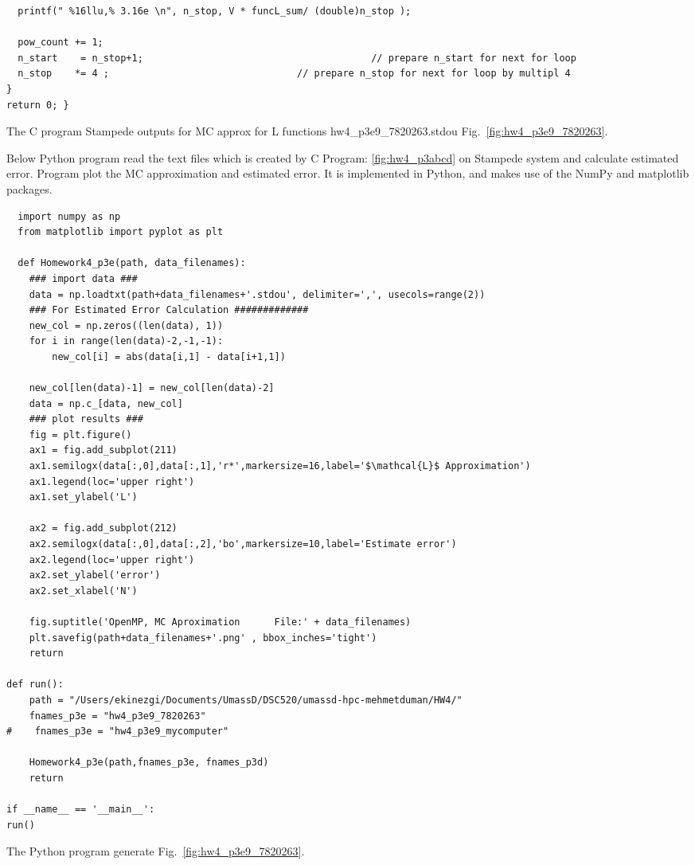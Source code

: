\documentclass{article}
\begin{document}
\begin{program}
\begin{verbatim}
  printf(" %16llu,% 3.16e \n", n_stop, V * funcL_sum/ (double)n_stop );

  pow_count += 1;
  n_start    = n_stop+1;                                        // prepare n_start for next for loop
  n_stop    *= 4 ;                                 // prepare n_stop for next for loop by multipl 4
}
return 0; }
	\end{verbatim}
	\caption{The C program Stampede outputs for MC approx for L functions hw4\_p3e9\_7820263.stdou Fig.\ \ref{fig:hw4_p3e9_7820263}.}
	\label{fig:hw4_p3e9}
 \end{program}																								 

\newpage


Below Python program read the text files which is created by C Program: \ref{fig:hw4_p3abcd} on Stampede system and calculate estimated error. Program  plot the MC approximation and estimated error. 
It is implemented in Python, and makes use of the NumPy and matplotlib packages.
\begin{program}
	\begin{verbatim}
  import numpy as np
  from matplotlib import pyplot as plt

  def Homework4_p3e(path, data_filenames):
    ### import data ###
    data = np.loadtxt(path+data_filenames+'.stdou', delimiter=',', usecols=range(2))
    ### For Estimated Error Calculation #############
    new_col = np.zeros((len(data), 1))
    for i in range(len(data)-2,-1,-1):
        new_col[i] = abs(data[i,1] - data[i+1,1])

    new_col[len(data)-1] = new_col[len(data)-2] 
    data = np.c_[data, new_col]
    ### plot results ###
    fig = plt.figure()
    ax1 = fig.add_subplot(211)
    ax1.semilogx(data[:,0],data[:,1],'r*',markersize=16,label='$\mathcal{L}$ Approximation')
    ax1.legend(loc='upper right')
    ax1.set_ylabel('L')

    ax2 = fig.add_subplot(212)
    ax2.semilogx(data[:,0],data[:,2],'bo',markersize=10,label='Estimate error')
    ax2.legend(loc='upper right')
    ax2.set_ylabel('error')
    ax2.set_xlabel('N')

    fig.suptitle('OpenMP, MC Aproximation      File:' + data_filenames)
    plt.savefig(path+data_filenames+'.png' , bbox_inches='tight')
    return

def run():    
    path = "/Users/ekinezgi/Documents/UmassD/DSC520/umassd-hpc-mehmetduman/HW4/"
    fnames_p3e = "hw4_p3e9_7820263"
#    fnames_p3e = "hw4_p3e9_mycomputer"

    Homework4_p3e(path,fnames_p3e, fnames_p3d) 
    return

if __name__ == '__main__':
run()
	\end{verbatim}
	\caption{The Python program generate Fig.\ \ref{fig:hw4_p3e9_7820263}.}
\end{program}
\end{document}
